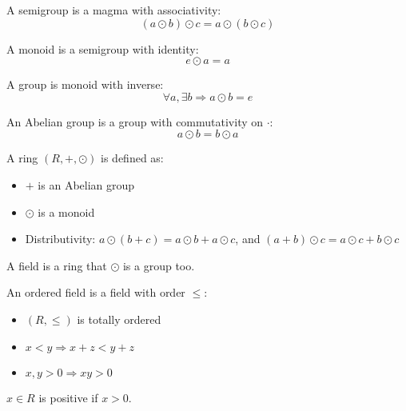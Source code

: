 \begin{definition}[semigroup]
    A semigroup is a magma with associativity:
    \begin{equation}
        (a \odot b) \odot c = a \odot (b \odot c)
    \end{equation}
\end{definition}

\begin{definition}[monoid]
    A monoid is a semigroup with identity:
    \begin{equation}
        e \odot a = a
    \end{equation}
\end{definition}

\begin{definition}[group]
    A group is monoid with inverse:
    \begin{equation}
        \forall a, \exists b \Rightarrow a \odot b = e
    \end{equation}
\end{definition}

\begin{definition}
    An Abelian group is a group with commutativity on $\cdot$:
    \begin{equation}
        a \odot b = b \odot a
    \end{equation}
\end{definition}

\begin{definition}[ring]
    A ring $(R, +, \odot)$ is defined as:
    \begin{itemize}
        \item $+$ is an Abelian group
        \item $\odot$ is a monoid
        \item Distributivity: $a \odot (b + c) = a \odot b + a \odot c$, and $(a+b) \odot c = a \odot c + b \odot c$
    \end{itemize}
    
\end{definition}

\begin{definition}[field]
    A field is a ring that $\odot$ is a group too.
\end{definition}

\begin{definition}
    An ordered field is a field with order $\leq$:
    \begin{itemize}
        \item $(R, \leq)$ is totally ordered
        \item $x < y \Rightarrow x + z < y + z$
        \item $x,y > 0 \Rightarrow xy > 0$
    \end{itemize}
    
    $x \in R$ is positive if $x > 0$.
\end{definition}


